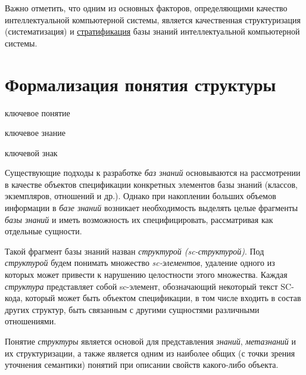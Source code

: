 Важно отметить, что одним из основных факторов, определяющими качество интеллектуальной компьютерной системы, является качественная структуризация (систематизация) и \uline{стратификация} базы знаний интеллектуальной компьютерной системы.


\section{Формализация понятия структуры}
\label{sec_structure}

\begin{SCn}
	\begin{scnrelfromlist}{ключевое понятие}
	\end{scnrelfromlist}
\end{SCn}

\begin{SCn}
	\begin{scnrelfromlist}{ключевое знание}
	\end{scnrelfromlist}
\end{SCn}

\begin{SCn}
	\begin{scnrelfromlist}{ключевой знак}
	\end{scnrelfromlist}
\end{SCn}

Существующие подходы к разработке \textit{баз знаний} основываются на рассмотрении в качестве объектов спецификации конкретных элементов базы знаний (классов, экземпляров, отношений и др.). Однако при накоплении больших объемов информации в \textit{базе знаний} возникает необходимость выделять целые фрагменты \textit{базы знаний} и иметь возможность их специфицировать, рассматривая как отдельные сущности. 

Такой фрагмент базы знаний назван \textit{структурой (sc-структурой)}. Под \textit{структурой} будем понимать множество \textit{sc-элементов}, удаление одного из которых может привести к нарушению целостности этого множества. Каждая \textit{структура} представляет собой sc-элемент, обозначающий некоторый текст SC-кода, который может быть объектом спецификации, в том числе входить в состав других структур, быть связанным с другими сущностями различными отношениями. 

Понятие \textit{структуры} является основой для представления \textit{знаний}, \textit{метазнаний} и их структуризации, а также является одним из наиболее общих (с точки зрения уточнения семантики) понятий при описании свойств какого-либо объекта. 

